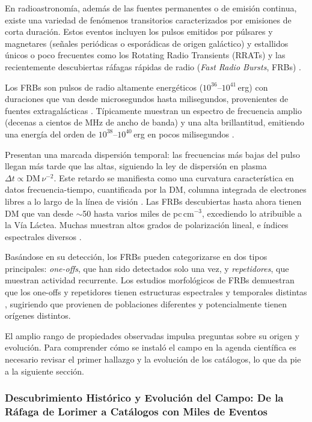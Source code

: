 En radioastronomía, además de las fuentes permanentes o de emisión continua, existe una variedad de fenómenos transitorios caracterizados por emisiones de corta duración. Estos eventos incluyen los pulsos emitidos por púlsares y magnetares (señales periódicas o esporádicas de origen galáctico) y estallidos únicos o poco frecuentes como los Rotating Radio Transients (RRATs) y las recientemente descubiertas ráfagas rápidas de radio (\textit{Fast Radio Bursts}, FRBs) \citep{Petroff_2022}.

Los FRBs son pulsos de radio altamente energéticos ($10^{36}$--$10^{41}$\,erg) con duraciones que van desde microsegundos hasta milisegundos, provenientes de fuentes extragalácticas \citep{Lorimer2007}. Típicamente muestran un espectro de frecuencia amplio (decenas a cientos de MHz de ancho de banda) y una alta brillantitud, emitiendo una energía del orden de $10^{38}$--$10^{40}$\,erg en pocos milisegundos \citep{Petroff_2022}.

Presentan una marcada dispersión temporal: las frecuencias más bajas del pulso llegan más tarde que las altas, siguiendo la ley de dispersión en plasma $\Delta t \propto \mathrm{DM}\,\nu^{-2}$. Este retardo se manifiesta como una curvatura característica en datos frecuencia-tiempo, cuantificada por la DM, columna integrada de electrones libres a lo largo de la línea de visión \citep{LorimerKramer2004}. Las FRBs descubiertas hasta ahora tienen DM que van desde $\sim$50 hasta varios miles de pc\,cm$^{-3}$, excediendo lo atribuible a la Vía Láctea. Muchas muestran altos grados de polarización lineal, e índices espectrales diversos \citep{CHIME2021}.

Basándose en su detección, los FRBs pueden categorizarse en dos tipos principales: \textit{one-offs}, que han sido detectados solo una vez, y \textit{repetidores}, que muestran actividad recurrente. Los estudios morfológicos de FRBs demuestran que los one-offs y repetidores tienen estructuras espectrales y temporales distintas \citep{Pleunis2021}, sugiriendo que provienen de poblaciones diferentes y potencialmente tienen orígenes distintos.

El amplio rango de propiedades observadas impulsa preguntas sobre su origen y evolución. Para comprender cómo se instaló el campo en la agenda científica es necesario revisar el primer hallazgo y la evolución de los catálogos, lo que da pie a la siguiente sección.

\subsubsection{Descubrimiento Histórico y Evolución del Campo: De la Ráfaga de Lorimer a Catálogos con Miles de Eventos}

